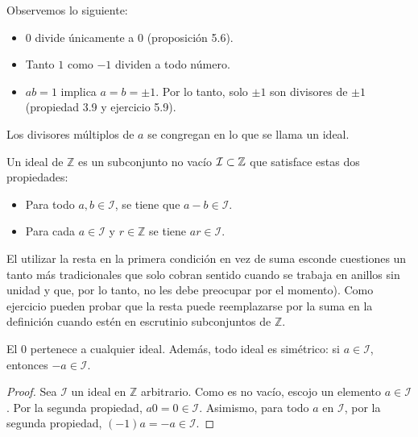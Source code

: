 \documentclass[main.tex]{subfiles}
\begin{document}
\begin{note}
    Observemos lo siguiente:
    \begin{itemize}
        \item $0$ divide \'unicamente a $0$ (proposici\'on 5.6).
        \item Tanto $1$ como $-1$ dividen a todo n\'umero.
        \item $ab = 1$ implica $a = b = \pm 1$. Por lo tanto, solo $\pm 1$ son divisores de $\pm 1$ (propiedad 3.9 y ejercicio 5.9).
    \end{itemize}
\end{note}

Los divisores m\'ultiplos de $a$ se congregan en lo que se llama un ideal.

\begin{defn}
    Un ideal de $\mathbb Z$ es un subconjunto no vac\'io $\mathcal{I} \subset \mathbb Z$ que satisface estas dos propiedades:
    \begin{itemize}
        \item Para todo $a, b \in \mathcal{I}$, se tiene que $a - b \in \mathcal{I}$.
        \item Para cada $a \in \mathcal{I}$ y $r \in \mathbb Z$ se tiene $ar \in \mathcal{I}$.
    \end{itemize}
\end{defn}

\begin{note}
    El utilizar la resta en la primera condici\'on en vez de suma esconde cuestiones un tanto m\'as tradicionales que solo cobran sentido cuando se trabaja en anillos sin unidad y que, por lo tanto, no les debe preocupar por el momento). Como ejercicio pueden probar que la resta puede reemplazarse por la suma en la definici\'on cuando est\'en en escrutinio subconjuntos de $\mathbb Z$.
\end{note}

\begin{proposition}
    El $0$ pertenece a cualquier ideal. Adem\'as, todo ideal es sim\'etrico: si $a \in \mathcal{I}$, entonces $-a \in \mathcal{I}$.
\end{proposition}

\begin{proof}
    Sea $\mathcal{I}$ un ideal en $\mathbb Z$ arbitrario. Como es no vac\'io, escojo un elemento $a \in \mathcal{I}$. Por la segunda propiedad, $a0 = 0 \in \mathcal{I}$. Asimismo, para todo $a$ en $\mathcal{I}$, por la segunda propiedad, $(-1)a = -a \in \mathcal{I}$.
\end{proof}
\end{document}
